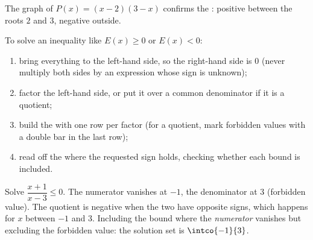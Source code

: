 \begin{omfigure}

{\small The graph of $P(x) = (x-2)(3-x)$ confirms the : positive
between the roots $2$ and $3$, negative outside.}
\end{omfigure}

\begin{method}\label{met:g10:algebra:signtable}
To solve an inequality like $E(x) \geq 0$ or $E(x) < 0$:
\begin{enumerate}
  \item bring everything to the left-hand side, so the right-hand side is
        $0$ (never multiply both sides by an expression whose sign is
        unknown);
  \item factor the left-hand side, or put it over a common denominator if
        it is a quotient;
  \item build the  with one row per factor (for a quotient, mark
        forbidden values with a double bar in the last row);
  \item read off the  where the requested sign holds, checking
        whether each bound is included.
\end{enumerate}
\end{method}

\begin{example}\label{ex:g10:algebra:quotientineq}
Solve $\dfrac{x + 1}{x - 3} \leq 0$. The numerator vanishes at $-1$, the
denominator at $3$ (forbidden value). The quotient is negative when the
two have opposite signs, which happens for $x$ between $-1$ and $3$.
Including the bound where the \emph{numerator} vanishes but excluding the
forbidden value: the solution set is $\intco{-1}{3}$.
\end{example}

